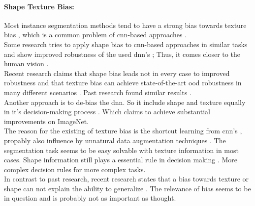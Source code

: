 		\paragraph{Shape Texture Bias:} Most instance segmentation methods tend to have a strong bias towards texture bias \cite{Theodoridis2022}, which is a common problem of \ac{cnn}-based approaches \cite{Geirhos2022}\cite{Baker2018}\cite{Tabak2023}.\\
		Some research tries to apply shape bias to \ac{cnn}-based approaches in similar tasks and show improved robustness of the used \ac{dnn}'s \cite{Geirhos2022}\cite{Hermann2020}; Thus, it comes closer to the human vision \cite{Geirhos2020}\cite{Mohla2022}.\\
		Recent research claims that shape bias leads not in every case to improved robustness and that texture bias can achieve state-of-the-art \ac{ood} robustness in many different scenarios \cite{Qiu2024}. Past research found similar results \cite{Brochu2019}.\\
		Another approach is to de-bias the \ac{dnn}. So it include shape and texture equally in it's decision-making process \cite{Li2021}\cite{Co2021}\cite{Chung2023}. Which claims to achieve substantial improvements on ImageNet. \\
		The reason for the existing of texture bias is the shortcut learning from \ac{cnn}'s \cite{Geirhos2020}, propably also influence by unnatural data augmentation techniques \cite{Hermann2020}. The segmentation task seems to be easy solvable with texture information in most cases. Shape information still plays a essential rule in decision making \cite{Tabak2023}. More complex decision rules for more complex tasks.\\
		In contrast to past research, recent research states that a bias towards texture or shape can not explain the ability to generalize \cite{Gavrikov2024}. The relevance of bias seems to be in question and is probably not as important as thought.%
